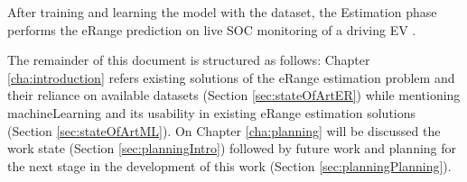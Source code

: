 After training and learning the model with the \gls{dataset},
the Estimation phase performs the \gls{eRange} prediction
on live \gls{SOC} monitoring of a driving \gls{EV}
.

The remainder of this document is structured as follows: 
Chapter \ref{cha:introduction} refers existing solutions 
of the \gls{eRange} estimation problem and their reliance on available
\glspl{dataset} (Section \ref{sec:stateOfArtER}) while
mentioning \gls{machineLearning} and its usability 
in existing \gls{eRange} estimation solutions 
(Section \ref{sec:stateOfArtML}).
On Chapter \ref{cha:planning} will be discussed the 
work state (Section \ref{sec:planningIntro}) followed by 
future work and planning for the next stage 
in the development of this work 
(Section \ref{sec:planningPlanning}). 
